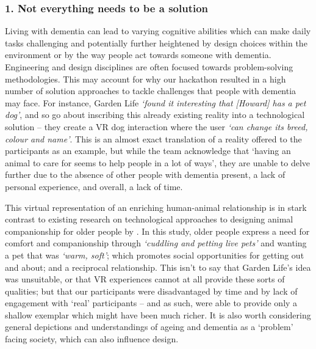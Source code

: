 \subsubsection{1. Not everything needs to be a solution}
\label{sterotype:One}
Living with dementia can lead to varying cognitive abilities which can make daily tasks challenging and potentially further heightened by design choices within the environment or by the way people act towards someone with dementia. Engineering and design disciplines are often focused towards problem-solving methodologies. This may account for why our hackathon resulted in a high number of solution approaches to tackle challenges that people with dementia may face. For instance, Garden Life \textit{‘found it interesting that [Howard] has a pet dog’}, and so go about inscribing this already existing reality into a technological solution – they create a VR dog interaction where the user \textit{‘can change its breed, colour and name’}. This is an almost exact translation of a reality offered to the participants as an example, but while the team acknowledge that ‘having an animal to care for seems to help people in a lot of ways’, they are unable to delve further due to the absence of other people with dementia present, a lack of personal experience, and overall, a lack of time. 

This virtual representation of an enriching human-animal relationship is in stark contrast to existing research on technological approaches to designing animal companionship for older people by \cite{lazar_rethinking_2016}. In this study, older people express a need for comfort and companionship through \textit{‘cuddling and petting live pets’} and wanting a pet that was \textit{‘warm, soft’}; which promotes social opportunities for getting out and about; and a reciprocal relationship. This isn’t to say that Garden Life’s idea was unsuitable, or that VR experiences cannot at all provide these sorts of qualities; but that our participants were disadvantaged by time and by lack of engagement with ‘real’ participants – and as such, were able to provide only a shallow exemplar which might have been much richer. It is also worth considering general depictions and understandings of ageing and dementia as a ‘problem’ facing society, which can also influence design. 

